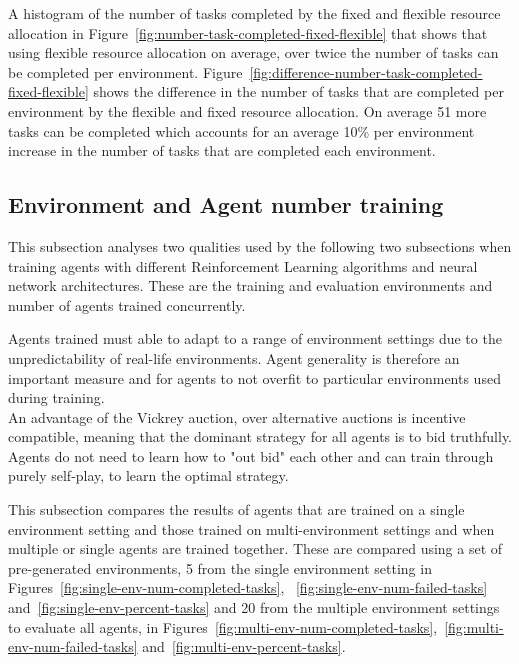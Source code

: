 A histogram of the number of tasks completed by the fixed and flexible resource allocation in
Figure~\ref{fig:number-task-completed-fixed-flexible} that shows that using flexible resource allocation on average,
over twice the number of tasks can be completed per environment.
Figure~\ref{fig:difference-number-task-completed-fixed-flexible} shows the difference in the number of tasks that are
completed per environment by the flexible and fixed resource allocation. On average 51 more tasks can be completed
which accounts for an average 10\% per environment increase in the number of tasks that are completed each environment.

\subsection{Environment and Agent number training}
\label{subsec:environment-and-agent-number-training}
This subsection analyses two qualities used by the following two subsections when training agents with different
Reinforcement Learning algorithms and neural network architectures. These are the training and evaluation environments
and number of agents trained concurrently.

Agents trained must able to adapt to a range of environment settings due to the unpredictability of real-life
environments. Agent generality is therefore an important measure and for agents to not overfit to particular
environments used during training. \\
An advantage of the Vickrey auction, over alternative auctions is incentive compatible, meaning that the dominant
strategy for all agents is to bid truthfully. Agents do not need to learn how to "out bid" each other and can train
through purely self-play, to learn the optimal strategy.

This subsection compares the results of agents that are trained on a single environment setting and those trained on
multi-environment settings and when multiple or single agents are trained together. These are compared using a set of
pre-generated environments, 5 from the single environment setting in Figures~\ref{fig:single-env-num-completed-tasks},
~\ref{fig:single-env-num-failed-tasks} and~\ref{fig:single-env-percent-tasks} and 20 from the multiple environment
settings to evaluate all agents, in Figures~\ref{fig:multi-env-num-completed-tasks},~\ref{fig:multi-env-num-failed-tasks}
and~\ref{fig:multi-env-percent-tasks}.

